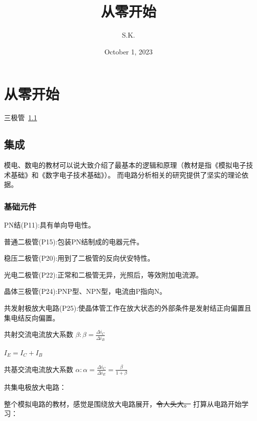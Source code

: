 \documentclass[cn,12pt]{elegantbook}
\title{从零开始}
\author{S.K.}
\date{October 1, 2023}
\begin{document}
\maketitle
\frontmatter
\tableofcontents%
\mainmatter
\chapter{从零开始}
\begin{introduction}

    \item 三极管~\ref{jichen}
\end{introduction}
\section{集成} \label{jichen}
模电、数电的教材可以说大致介绍了最基本的逻辑和原理（教材是指《模拟电子技术基础》和《数字电子技术基础》）。
而电路分析相关的研究提供了坚实的理论依据。

\subsection{基础元件}
PN结(P11):具有单向导电性。

普通二极管(P15):包装PN结制成的电器元件。

稳压二极管(P20):用到了二极管的反向伏安特性。

光电二极管(P22):正常和二极管无异，光照后，等效附加电流源。

晶体三极管(P24):PNP型、NPN型，电流由P指向N。

共发射极放大电路(P25):使晶体管工作在放大状态的外部条件是发射结正向偏置且集电结反向偏置。

\begin{definition}[]

    共射交流电流放大系数  $\beta : \beta=\frac{\Delta i_C}{\Delta i_B}$

    $I_E =I_C +I_B $

    共基交流电流放大系数  $\alpha : \alpha=\frac{\Delta i_C}{\Delta i_E} =\frac{\beta }{1+\beta }$




\end{definition}

共集电极放大电路：

\begin{note}
整个模拟电路的教材，感觉是围绕放大电路展开，\sout{令人头大。}
打算从电路开始学习：
\end{note}
\end{document}
